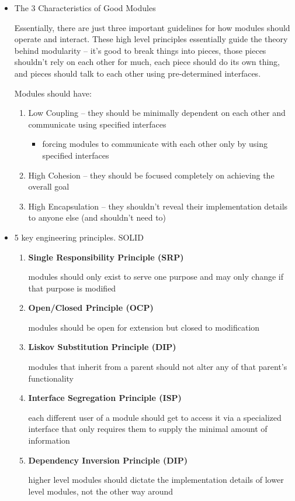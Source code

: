 \documentclass[11pt]{article}
\begin{document}
\begin{itemize}
\item The 3 Characteristics of Good Modules

Essentially, there are just three important guidelines for how modules 
should operate and interact. These high level principles essentially guide
the theory behind modularity -- it's good to break things into pieces, 
those pieces shouldn't rely on each other for much, each piece should do 
its own thing, and pieces should talk to each other using pre-determined
interfaces.

Modules should have:

\begin{enumerate}
\item Low Coupling -- they should be minimally dependent on each other and 
communicate using specified interfaces

\begin{itemize}
\item forcing modules to communicate with each other only by using 
specified interfaces
\end{itemize}

\item High Cohesion -- they should be focused completely on achieving the 
overall goal

\item High Encapsulation -- they shouldn't reveal their implementation 
details to anyone else (and shouldn't need to)
\end{enumerate}

\item 5 key engineering principles. SOLID

\begin{enumerate}
\item \textbf{Single Responsibility Principle (SRP)} 

modules should only exist to serve one purpose and may only change if 
that purpose is modified

\item \textbf{Open/Closed Principle (OCP)}

modules should be open for extension but closed to modification

\item \textbf{Liskov Substitution Principle (DIP)}

modules that inherit from a parent should not alter any of that 
parent's functionality

\item \textbf{Interface Segregation Principle (ISP)}

each different user of a module should get to access it via a 
specialized interface that only requires them to supply the minimal 
amount of information

\item \textbf{Dependency Inversion Principle (DIP)}

higher level modules should dictate the implementation details of lower
level modules, not the other way around
\end{enumerate}
\end{itemize}
\end{document}

